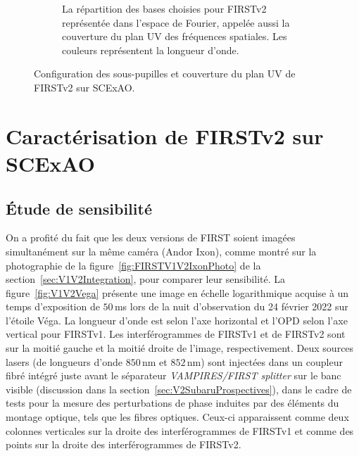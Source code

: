 \begin{figure}[ht!]
\begin{subfigure}[t]{0.55\textwidth}
        \caption{La répartition des bases choisies pour FIRSTv2 représentée dans l'espace de Fourier, appelée aussi la couverture du plan UV des fréquences spatiales. Les couleurs représentent la longueur d'onde.}
        \label{fig:SegUVSubaruB}
    \end{subfigure}
    \caption[Configuration des sous-pupilles et couverture du plan UV de FIRSTv2 sur SCExAO.]{Configuration des sous-pupilles et couverture du plan UV de FIRSTv2 sur SCExAO.}
    \label{fig:SegUVSubaru}
\end{figure}


\section{Caractérisation de FIRSTv2 sur SCExAO}

\subsection{Étude de sensibilité}
\label{sec:V1V2Throughput}

On a profité du fait que les deux versions de \ac{FIRST} soient imagées simultanément sur la même caméra (Andor Ixon), comme montré sur la photographie de la figure~\ref{fig:FIRSTV1V2IxonPhoto} de la section~\ref{sec:V1V2Integration}, pour comparer leur sensibilité. La figure~\ref{fig:V1V2Vega} présente une image en échelle logarithmique acquise à un temps d'exposition de $50 \,$ms lors de la nuit d'observation du 24 février 2022 sur l'étoile Véga. La longueur d'onde est selon l'axe horizontal et l'\ac{OPD} selon l'axe vertical pour \ac{FIRSTv1}. Les interférogrammes de \ac{FIRSTv1} et de \ac{FIRSTv2} sont sur la moitié gauche et la moitié droite de l'image, respectivement. Deux sources lasers (de longueurs d'onde $850 \,$nm et $852 \,$nm) sont injectées dans un coupleur fibré intégré juste avant le séparateur \textit{VAMPIRES/FIRST splitter} sur le banc visible (discussion dans la section~\ref{sec:V2SubaruProspectives}), dans le cadre de tests pour la mesure des perturbations de phase induites par des éléments du montage optique, tels que les fibres optiques. Ceux-ci apparaissent comme deux colonnes verticales sur la droite des interférogrammes de \ac{FIRSTv1} et comme des points sur la droite des interférogrammes de \ac{FIRSTv2}.

